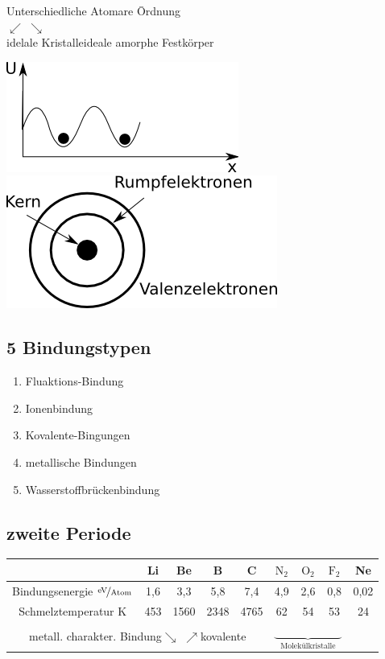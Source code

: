 \begin{tabbing}
\qquad Unterschiedliche Atomare \=Ordnung \\ 
 \qquad $\swarrow$ \> $\searrow$\qquad \\ 
 idelale Kristalle\>ideale amorphe Festkörper 
\end{tabbing} 

\includegraphics[scale=1]{images/2009-10-20-potentialberge.png}
\includegraphics[scale=1]{images/2009-10-20-atomaufbau.png}

\subsection{5 Bindungstypen}
\begin{enumerate}
\item Fluaktions-Bindung
\item Ionenbindung
\item Kovalente-Bingungen
\item metallische Bindungen
\item Wasserstoffbrückenbindung
\end{enumerate}

\subsection{zweite Periode}
\begin{tabular}[b]{|c|c|c|c|c|c|c|c|c|}
\hline & Li & Be & B & C & $\text{N}_2$ & $\text{O}_2$ & $\text{F}_2$ & Ne \\ 
\hline Bindungsenergie $\nicefrac{\text{eV}}{\text{Atom}}$ & 1,6 & 3,3 & 5,8 & 7,4 & 4,9 & 2,6 & 0,8 & 0,02 \\ 
Schmelztemperatur K & 453 & 1560 & 2348 & 4765 & 62 & 54 & 53 & 24 \\ 
\hline\multicolumn{5}{c}{metall. charakter. Bindung$\searrow$ \quad $\nearrow$kovalente}  &\multicolumn{3}{c}{$\underbrace{\phantom{\qquad\qquad\qquad}}_{\text{Molekülkristalle}}$} \\ 
\end{tabular} 


